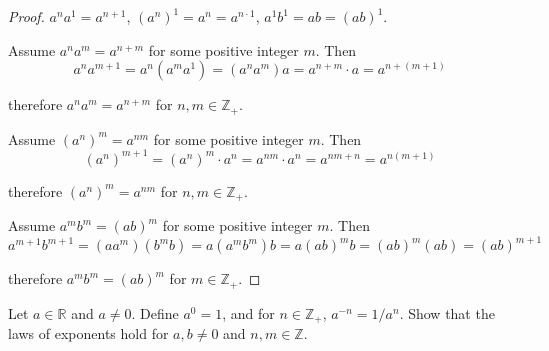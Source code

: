 \begin{proof}
    $a^{n}a^{1} = a^{n+1}$, ${(a^{n})}^{1} = a^{n} = a^{n\cdot 1}$, $a^{1}b^{1} = ab = {(ab)}^{1}$.

    Assume $a^{n}a^{m} = a^{n+m}$ for some positive integer $m$. Then
    \[
        a^{n}a^{m+1} = a^{n}(a^{m}a^{1}) = (a^{n}a^{m})a = a^{n+m}\cdot a = a^{n+(m+1)}
    \]

    therefore $a^{n}a^{m} = a^{n+m}$ for $n, m\in\mathbb{Z}_{+}$.

    Assume ${(a^{n})}^{m} = a^{nm}$ for some positive integer $m$. Then
    \[
        {(a^{n})}^{m+1} = {(a^{n})}^{m}\cdot a^{n} = a^{nm}\cdot a^{n} = a^{nm + n} = a^{n(m+1)}
    \]

    therefore ${(a^{n})}^{m} = a^{nm}$ for $n, m\in\mathbb{Z}_{+}$.

    Assume $a^{m}b^{m} = {(ab)}^{m}$ for some positive integer $m$. Then
    \[
        a^{m+1}b^{m+1} = (aa^{m})(b^{m}b) = a(a^{m}b^{m})b = a{(ab)}^{m}b = {(ab)}^{m}(ab) = {(ab)}^{m+1}
    \]

    therefore $a^{m}b^{m} = {(ab)}^{m}$ for $m\in\mathbb{Z}_{+}$.
\end{proof}

\begin{exercise}\label{chapter1:section4:exercise7}
    Let $a\in\mathbb{R}$ and $a\ne 0$. Define $a^{0} = 1$, and for $n\in\mathbb{Z}_{+}$, $a^{-n} = 1/a^{n}$. Show that the laws of exponents hold for $a, b\ne 0$ and $n, m\in\mathbb{Z}$.
\end{exercise}

